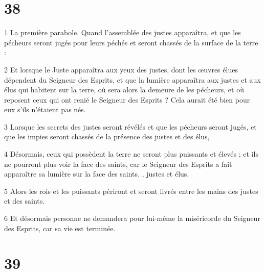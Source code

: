 \chapter{38}
\par 1 La première parabole. Quand l’assemblée des justes apparaîtra, et que les pécheurs seront jugés pour leurs péchés et seront chassés de la surface de la terre :
\par 2 Et lorsque le Juste apparaîtra aux yeux des justes, dont les œuvres élues dépendent du Seigneur des Esprits, et que la lumière apparaîtra aux justes et aux élus qui habitent sur la terre, où sera alors la demeure de les pécheurs, et où reposent ceux qui ont renié le Seigneur des Esprits ? Cela aurait été bien pour eux s'ils n'étaient pas nés.
\par 3 Lorsque les secrets des justes seront révélés et que les pécheurs seront jugés, et que les impies seront chassés de la présence des justes et des élus,
\par 4 Désormais, ceux qui possèdent la terre ne seront plus puissants et élevés ; et ils ne pourront plus voir la face des saints, car le Seigneur des Esprits a fait apparaître sa lumière sur la face des saints. , justes et élus.
\par 5 Alors les rois et les puissants périront et seront livrés entre les mains des justes et des saints.
\par 6 Et désormais personne ne demandera pour lui-même la miséricorde du Seigneur des Esprits, car sa vie est terminée.

\chapter{39}

